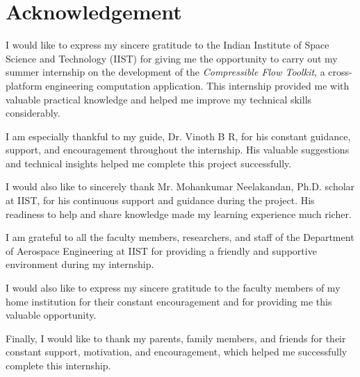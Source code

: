 \chapter*{Acknowledgement}

\vspace{1cm}

\begin{justify}

I would like to express my sincere gratitude to the Indian Institute of Space Science and Technology (IIST) for giving me the opportunity to carry out my summer internship on the development of the \textit{Compressible Flow Toolkit}, a cross-platform engineering computation application. This internship provided me with valuable practical knowledge and helped me improve my technical skills considerably.

I am especially thankful to my guide, Dr. Vinoth B R, for his constant guidance, support, and encouragement throughout the internship. His valuable suggestions and technical insights helped me complete this project successfully.

I would also like to sincerely thank Mr. Mohankumar Neelakandan, Ph.D. scholar at IIST, for his continuous support and guidance during the project. His readiness to help and share knowledge made my learning experience much richer.

I am grateful to all the faculty members, researchers, and staff of the Department of Aerospace Engineering at IIST for providing a friendly and supportive environment during my internship.

I would also like to express my sincere gratitude to the faculty members of my home institution for their constant encouragement and for providing me this valuable opportunity.

Finally, I would like to thank my parents, family members, and friends for their constant support, motivation, and encouragement, which helped me successfully complete this internship.

\end{justify}

